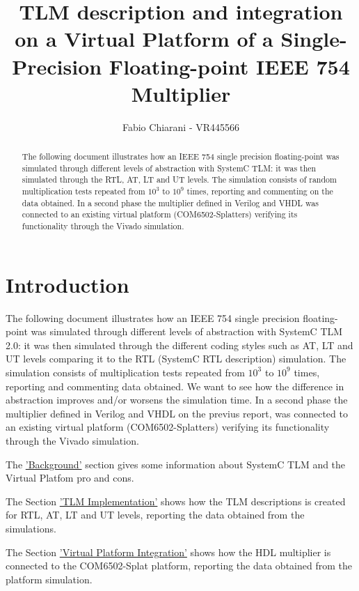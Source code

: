 \documentclass[]{IEEEtran}
\title{TLM description and integration on a Virtual Platform of a Single-Precision Floating-point IEEE 754 Multiplier}
\author{Fabio Chiarani - VR445566}
\begin{document}
	\maketitle
	
	\begin{abstract}
		The following document illustrates how an IEEE 754 single precision floating-point was simulated through different levels of abstraction with SystemC TLM: it was then simulated through the RTL, AT, LT and UT levels. The simulation consists of random multiplication tests repeated from $10^3$ to $10^9$ times, reporting and commenting on the data obtained. In a second phase the multiplier defined in Verilog and VHDL was connected to an existing virtual platform (COM6502-Splatters) verifying its functionality through the Vivado simulation.
	\end{abstract}
	
	\section{Introduction}
The following document illustrates how an IEEE 754 single precision floating-point was simulated through different levels of abstraction with SystemC TLM 2.0: it was then simulated through the different coding styles such as AT, LT and UT levels comparing it to the RTL (SystemC RTL description)  simulation. The simulation consists of multiplication tests repeated from $10^3$ to $10^9$ times, reporting and commenting data obtained. We want to see how the difference in abstraction improves and/or worsens the simulation time. In a second phase the multiplier defined in Verilog and VHDL on the previus report, was connected to an existing virtual platform (COM6502-Splatters) verifying its functionality through the Vivado simulation.

	The \hyperref[sec:Background]{'Background'} section gives some information about SystemC TLM and the Virtual Platfom pro and cons. 
	
	The Section \hyperref[sec:impl]{'TLM Implementation'} shows how the TLM descriptions is created for RTL, AT, LT and UT levels, reporting the data obtained from the simulations.
	
	The Section \hyperref[sec:vp]{'Virtual Platform Integration'} shows how the HDL multiplier is connected to the COM6502-Splat platform, reporting the data obtained from the platform simulation.
\end{document}
